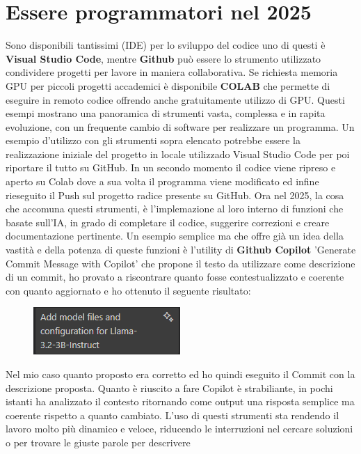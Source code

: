 \documentclass[12pt,a4paper,openright,twoside]{book}
\begin{document}
\section{Essere programmatori nel 2025}
Sono disponibili tantissimi (IDE) per lo sviluppo del codice uno di questi è \textbf{Visual Studio Code},
mentre \textbf{Github} può essere lo strumento utilizzato condividere progetti per lavore in maniera collaborativa.
Se richiesta memoria GPU per piccoli progetti accademici è disponibile \textbf{COLAB} che permette di eseguire in remoto codice offrendo anche gratuitamente utilizzo di GPU.
Questi esempi mostrano una panoramica di strumenti vasta, complessa e in rapita evoluzione, con un frequente cambio di software per realizzare un programma.
Un esempio d'utilizzo con gli strumenti sopra elencato potrebbe essere la realizzazione iniziale del progetto in locale utilizzado Visual Studio Code per poi riportare il tutto su GitHub.
In un secondo momento il codice viene ripreso e aperto su Colab dove a sua volta il programma viene modificato ed infine rieseguito il Push sul progetto radice presente su GitHub.
Ora nel 2025, la cosa che accomuna questi strumenti, è l'implemazione al loro interno di funzioni che basate sull'IA, in grado di completare il codice, suggerire correzioni e creare documentazione pertinente.
Un esempio semplice ma che offre già un idea della vastità e della potenza di queste funzioni è l'utility di \textbf{Github Copilot} 'Generate Commit Message with Copilot'
che propone il testo da utilizzare come descrizione di un commit, ho provato a riscontrare quanto fosse contestualizzato e coerente 
con quanto aggiornato e ho ottenuto il seguente risultato:
\begin{figure}[h]
    \centering
    \includegraphics[width=0.5\linewidth]{figures/commit.png}
    \label{fig:Commeit-Autogenerato}
\end{figure}
\newline
Nel mio caso quanto proposto era corretto ed ho quindi eseguito il Commit con la descrizione proposta.
Quanto è riuscito a fare Copilot è strabiliante, in pochi istanti ha analizzato il contesto ritornando come output una risposta semplice ma coerente rispetto a quanto cambiato.
L'uso di questi strumenti sta rendendo il lavoro molto più dinamico e veloce, riducendo le interruzioni nel cercare soluzioni o per trovare le giuste parole per descrivere
\end{document}
